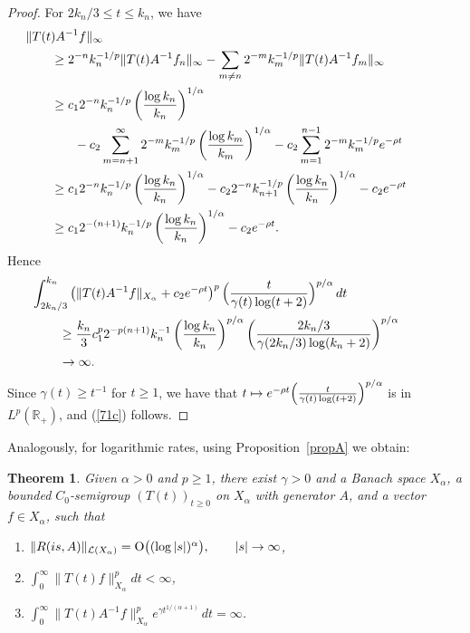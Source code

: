 \documentclass[11pt]{amsart}
\newtheorem{theorem}{Theorem}[section]
\theoremstyle{definition}
\theoremstyle{remark}
\numberwithin{equation}{section}
\begin{document}
\begin{proof}
For $2k_{n}/3 \le t \le k_{n}$, we have
\begin{align*}
\lefteqn{\hskip-20pt\|T(t)A^{-1}f\|_\infty} \\
 &\ge 2^{-n}k_{n}^{-1/p} \|T(t)A^{-1}f_{n}\|_\infty - \sum_{m \ne n} 2^{-m}k_{m}^{-1/p} \|T(t)A^{-1}f_{m}\|_\infty \\
&\ge c_1  2^{-n}k_{n}^{-1/p} \left( \frac{ \log k_{n}}{k_{n}} \right)^{1/\alpha} \\
&\phantom{XX} - c_2 \sum_{m=n+1}^\infty  2^{-m} k_{m}^{-1/p} \left( \frac{ \log k_{m}}{k_{m}} \right)^{1/\alpha} - c_2 \sum_{m=1}^{n-1}  2^{-m} k_{m}^{-1/p} e^{-\rho t}  \\
&\ge c_1  2^{-n}k_{n}^{-1/p} \left( \frac{ \log k_{n}}{k_{n}} \right)^{1/\alpha} - c_2 2^{-n} k_{n+1}^{-1/p} \left( \frac{ \log k_{n}}{k_{n}} \right)^{1/\alpha} -c_2 e^{-\rho t} \\
&\ge  c_1  2^{-(n+1)}k_{n}^{-1/p} \left( \frac{ \log k_{n}}{k_{n}} \right)^{1/\alpha} - c_2 e^{-\rho t}.
\end{align*}
Hence
\begin{align*}
\lefteqn{\hskip-20pt\int_{2k_{n}/3}^{k_{n}} \left( \|T(t)A^{-1}f\|_{X_{\alpha}} + c_2e^{-\rho t} \right)^p \Bigl(\frac{t}{\gamma(t)\log (t+2)}\Bigr)^{p/\alpha}
\,dt}  \\
&\ge \frac{k_{n}}{3} c_1^p 2^{-p(n+1)} k_{n}^{-1} \left( \frac{ \log k_{n}}{k_{n}} \right)^{p/\alpha} \left( \frac{2k_{n}/3}{\gamma(2k_n/3) \log(k_{n} + 2)} \right)^{p/\alpha}\\
&\to\infty.
\end{align*}
Since $\gamma(t) \ge t^{-1}$ for $t\ge1$, we have that $t \mapsto e^{-\rho t} \Bigl(\frac{t}{\gamma(t)\log (t+2)}\Bigr)^{p/\alpha}$ is in $L^p({{\mathbb R}}_+)$, and (\ref{71c}) follows.
\end{proof}

Analogously, for logarithmic rates, using Proposition~\ref{propA} we obtain:

\begin{theorem}\label{xyzA}
Given $\alpha > 0$ and $p\ge 1$, there exist $\gamma>0$ and a Banach space $X_{\alpha}$, a bounded $C_0$-semigroup
$(T(t))_{t \ge 0}$ on $X_{\alpha}$ with
generator $A$, and a vector $f\in X_{\alpha}$, such that
\begin{enumerate} [\rm (a)]
\item  $\|R(is,A)\|_{\mathcal{L}(X_\alpha)}={\rm O}\big((\log |s|)^{\alpha}\big), \qquad |s| \to \infty$, \smallskip
\item $\displaystyle \int_0^\infty \|T(t)f\|^p_{X_{\alpha}}dt<\infty$, \smallskip
\item $\displaystyle \int_0^\infty\|T(t)A^{-1}f\|^p_{X_{\alpha}} e^{\gamma t^{1/(\alpha+1)}}
\,dt=\infty$.
\end{enumerate}
\end{theorem}
\end{document}
